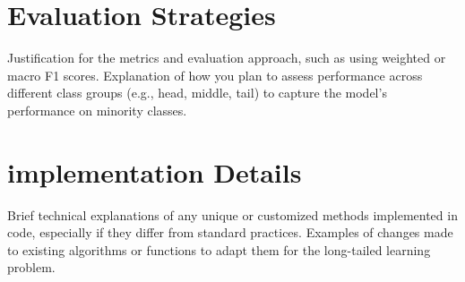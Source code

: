 \section{Evaluation Strategies}
Justification for the metrics and evaluation approach, such as using weighted or macro F1 scores.
Explanation of how you plan to assess performance across different class groups (e.g., head, middle, tail) to capture the model’s performance on minority classes.

\section{implementation Details}
Brief technical explanations of any unique or customized methods implemented in code, especially if they differ from standard practices.
Examples of changes made to existing algorithms or functions to adapt them for the long-tailed learning problem.

